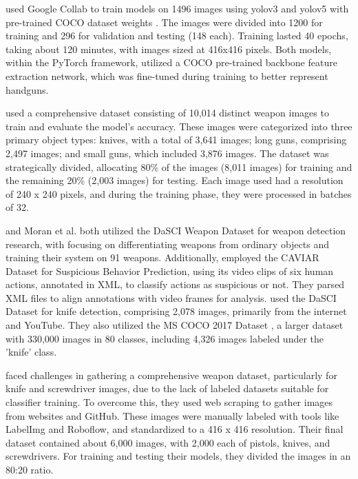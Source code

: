 \citet{rfc5} used Google Collab \cite{rfc26} to train models on 1496 images using \ac{yolo}v3 and \ac{yolo}v5 with pre-trained COCO dataset weights \cite{rfc16}. The images were divided into 1200 for training and 296 for validation and testing (148 each). Training lasted 40 epochs, taking about 120 minutes, with images sized at 416x416 pixels. Both models, within the PyTorch framework, utilized a COCO pre-trained backbone feature extraction network, which was fine-tuned during training to better represent handguns.

\citet{rfc6} used a comprehensive dataset consisting of 10,014 distinct weapon images to train and evaluate the model's accuracy. These images were categorized into three primary object types: knives, with a total of 3,641 images; long guns, comprising 2,497 images; and small guns, which included 3,876 images. The dataset was strategically divided, allocating 80\% of the images (8,011 images) for training and the remaining 20\% (2,003 images) for testing. Each image used had a resolution of 240 x 240 pixels, and during the training phase, they were processed in batches of 32.

\citet{rfc7} and Moran et al. \citet{rfc18} both utilized the DaSCI Weapon Dataset \cite{rfc29} for weapon detection research, with \citet{rfc7} focusing on differentiating weapons from ordinary objects and training their system on 91 weapons. Additionally, employed the CAVIAR Dataset \cite{rfc30} for Suspicious Behavior Prediction, using its video clips of six human actions, annotated in XML, to classify actions as suspicious or not. They parsed XML files to align annotations with video frames for analysis. \citet{rfc18} used the DaSCI Dataset \cite{rfc29} for knife detection, comprising 2,078 images, primarily from the internet and YouTube. They also utilized the MS COCO 2017 Dataset \cite{rfc16}, a larger dataset with 330,000 images in 80 classes, including 4,326 images labeled under the 'knife' class.

\citet{rfc17} faced challenges in gathering a comprehensive weapon dataset, particularly for knife and screwdriver images, due to the lack of labeled datasets suitable for classifier training. To overcome this, they used web scraping to gather images from websites and GitHub. These images were manually labeled with tools like LabelImg and Roboflow, and standardized to a 416 x 416 resolution. Their final dataset contained about 6,000 images, with 2,000 each of pistols, knives, and screwdrivers. For training and testing their models, they divided the images in an 80:20 ratio.

